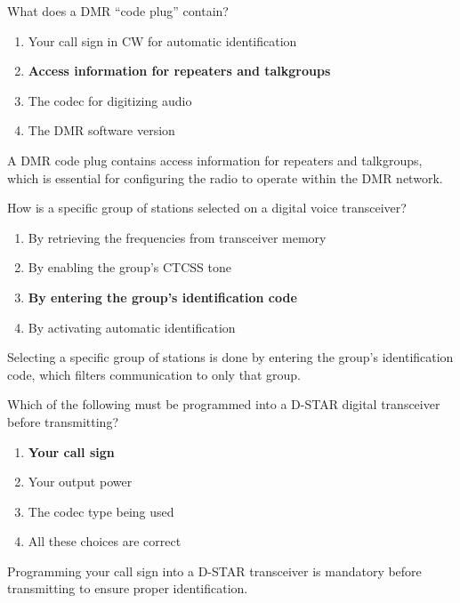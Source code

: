 
\begin{tcolorbox}[colback=gray!10!white,colframe=black!75!black,title={T4B07}]
    What does a DMR “code plug” contain?
    \begin{enumerate}[label=\Alph*,noitemsep]
        \item Your call sign in CW for automatic identification
        \item \textbf{Access information for repeaters and talkgroups}
        \item The codec for digitizing audio
        \item The DMR software version
    \end{enumerate}
\end{tcolorbox}
A DMR code plug contains access information for repeaters and talkgroups, which is essential for configuring the radio to operate within the DMR network.


\begin{tcolorbox}[colback=gray!10!white,colframe=black!75!black,title={T4B09}]
    How is a specific group of stations selected on a digital voice transceiver?
    \begin{enumerate}[label=\Alph*,noitemsep]
        \item By retrieving the frequencies from transceiver memory
        \item By enabling the group’s CTCSS tone
        \item \textbf{By entering the group’s identification code}
        \item By activating automatic identification
    \end{enumerate}
\end{tcolorbox}
Selecting a specific group of stations is done by entering the group’s identification code, which filters communication to only that group.


\begin{tcolorbox}[colback=gray!10!white,colframe=black!75!black,title={T4B11}]
    Which of the following must be programmed into a D-STAR digital transceiver before transmitting?
    \begin{enumerate}[label=\Alph*,noitemsep]
        \item \textbf{Your call sign}
        \item Your output power
        \item The codec type being used
        \item All these choices are correct
    \end{enumerate}
\end{tcolorbox}
Programming your call sign into a D-STAR transceiver is mandatory before transmitting to ensure proper identification.

